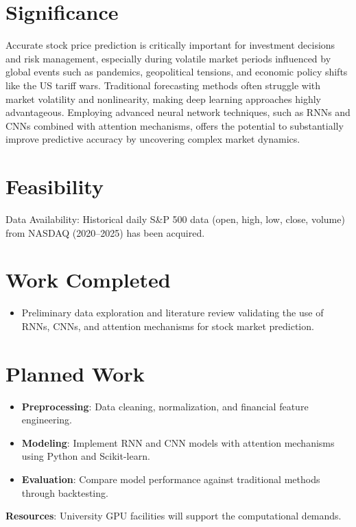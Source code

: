 \documentclass[a4paper,11pt]{article} %
\begin{document}
\section{Significance}

Accurate stock price prediction is critically important for investment decisions and risk management, especially during volatile market periods influenced by global events such as pandemics, geopolitical tensions, and economic policy shifts like the US tariff wars. Traditional forecasting methods often struggle with market volatility and nonlinearity, making deep learning approaches highly advantageous. Employing advanced neural network techniques, such as RNNs and CNNs combined with attention mechanisms, offers the potential to substantially improve predictive accuracy by uncovering complex market dynamics. 

\section{Feasibility}

Data Availability: Historical daily S\&P 500 data (open, high, low, close, volume) from NASDAQ (2020–2025) has been acquired. 
\section*{Work Completed}
\begin{itemize}
    \item Preliminary data exploration and literature review validating the use of RNNs, CNNs, and attention mechanisms for stock market prediction.
\end{itemize}

\section*{Planned Work}
\begin{itemize}
    \item \textbf{Preprocessing}: Data cleaning, normalization, and financial feature engineering.
    \item \textbf{Modeling}: Implement RNN and CNN models with attention mechanisms using Python and Scikit-learn.
    \item \textbf{Evaluation}: Compare model performance against traditional methods through backtesting.
\end{itemize}

\textbf{Resources}: University GPU facilities will support the computational demands.
\end{document}
